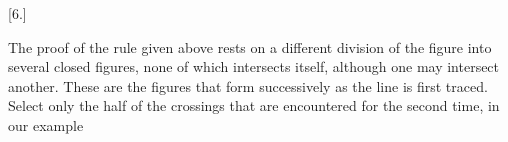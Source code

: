 \begin{center}[6.]\end{center}

The proof of the rule given above rests on a different division
of the figure into several closed figures, none of which intersects
itself, although one may intersect another. These are the
figures that form successively as the line is first traced.
Select only the half of the crossings that are encountered
for the second time, in our example
